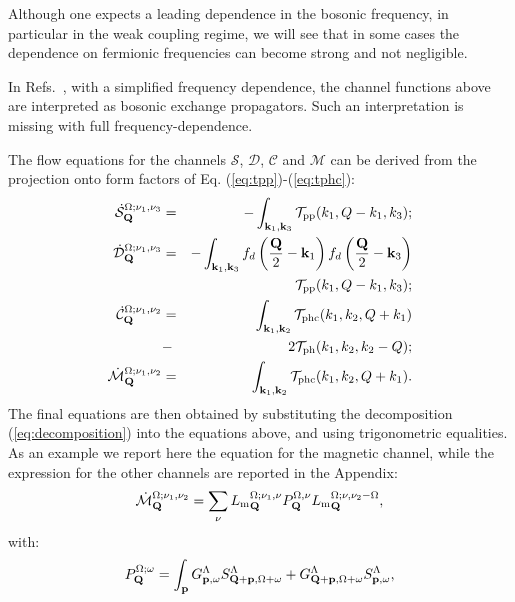 Although one expects a leading dependence in the bosonic frequency, 
in particular in the weak coupling regime, we will see that in some cases the dependence on fermionic frequencies can become strong and not negligible.

In Refs.~, with a simplified frequency dependence, the channel functions above are interpreted as bosonic exchange propagators. Such an interpretation is missing with full frequency-dependence.

The flow equations for the channels $\mathcal{S}$,  $\mathcal{D}$, $\mathcal{C}$ and $\mathcal{M}$ can be derived from the projection onto form factors of Eq. (\ref{eq:tpp})-(\ref{eq:tphc}):
\begin{eqnarray}
\dot{\mathcal{S}}_{\mathbf{Q}}^{\Omega;\nu_1,\nu_3}  &=& - \int _{\mathbf{k}_1, \mathbf{k}_3 } \mathcal{T}_{\mathrm{pp}}(k_1,Q-k_1,k_3); \\ 
\dot{\mathcal{D}}_{\mathbf{Q}}^{\Omega;\nu_1,\nu_3}  &=& -
\int _{\mathbf{k}_1,\mathbf{k}_3}  f_d\left( {\frac{\mathbf{Q}}{2} - \mathbf{k}_1} \right ) f_d\left ({\frac{\mathbf{Q}}{2} - \mathbf{k}_3} \right)  \nonumber \\ 
 &&\mathcal{T}_{\mathrm{pp}}(k_1,Q-k_1,k_3) ; 
\\
\nonumber
\dot{\mathcal{C}}_{\mathbf{Q}}^{\Omega;\nu_1,\nu_2} &=& 
\int _{\mathbf{k}_1,\mathbf{k}_2}   \mathcal{T}_{\mathrm{phc}}(k_1,k_2,Q+k_1)\\ &-&2\mathcal{T}_{\mathrm{ph}}(k_1,k_2,k_2-Q) ; 
\\ 
\dot{\mathcal{M}}_{\mathbf{Q}}^{\Omega;\nu_1,\nu_2} & =& 
\int _{\mathbf{k}_1,\mathbf{k}_2}  \mathcal{T}_{\mathrm{phc}}(k_1,k_2,Q+k_1). 
\end{eqnarray}
The final equations are then obtained by substituting the decomposition (\ref{eq:decomposition}) into the equations above, and using trigonometric equalities.
As an example we report here the equation for the magnetic channel, while the expression for the other channels are reported in the Appendix: 
\begin{equation}
\dot{\mathcal{M}}_{\mathbf{Q}}^{\Omega;\nu_1,\nu_2} = \sum_{\nu}{L_\mathrm{m}}^{\Omega; \nu_1,\nu}_{\mathbf{Q}} P_{\mathbf{Q}}^{\Omega,\nu} {L_\mathrm{m}}^{\Omega; \nu,\nu_2-\Omega}_{\mathbf{Q}}, 
\end{equation} 	   
with: 
\begin{equation}
P_{\mathbf{Q}}^{\Omega;\omega} = \int_{\mathbf{p}}  G^\Lambda_{\mathbf{p},\omega}S^\Lambda_{\mathbf{Q}+\mathbf{p},\Omega+\omega} +G^\Lambda_{\mathbf{Q}+\mathbf{p},\Omega+\omega}
S^\Lambda_{\mathbf{p},\omega}, 
\end{equation} 

